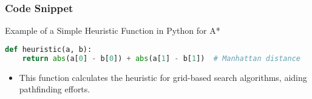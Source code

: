 \documentclass[aspectratio=169]{beamer}
\begin{document}
\begin{frame}[fragile]
    \frametitle{Code Snippet}
    \begin{block}{Example of a Simple Heuristic Function in Python for A*}
        \begin{lstlisting}[language=Python]
def heuristic(a, b):
    return abs(a[0] - b[0]) + abs(a[1] - b[1])  # Manhattan distance
        \end{lstlisting}
    \end{block}
    \begin{itemize}
        \item This function calculates the heuristic for grid-based search algorithms, aiding pathfinding efforts.
    \end{itemize}
\end{frame}
\end{document}
